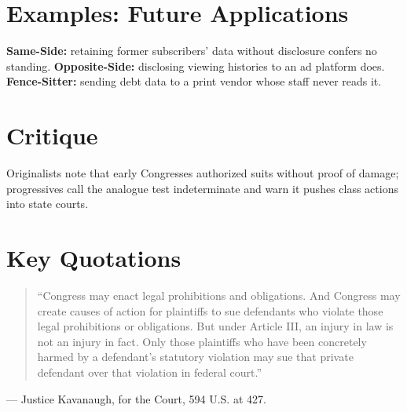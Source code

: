 \documentclass[12pt]{article}
\begin{document}
\section{Examples: Future Applications}
\textbf{Same-Side:} retaining former subscribers' data without disclosure confers no standing. \textbf{Opposite-Side:} disclosing viewing histories to an ad platform does. \textbf{Fence-Sitter:} sending debt data to a print vendor whose staff never reads it.

\section{Critique}
Originalists note that early Congresses authorized suits without proof of damage; progressives call the analogue test indeterminate and warn it pushes class actions into state courts.

\section{Key Quotations}
\begin{quote}
``Congress may enact legal prohibitions and obligations. And Congress may create causes of action for plaintiffs to sue defendants who violate those legal prohibitions or obligations. But under Article III, an injury in law is not an injury in fact. Only those plaintiffs who have been concretely harmed by a defendant's statutory violation may sue that private defendant over that violation in federal court.''
\end{quote}
\noindent --- Justice Kavanaugh, for the Court, 594 U.S. at 427.
\end{document}
